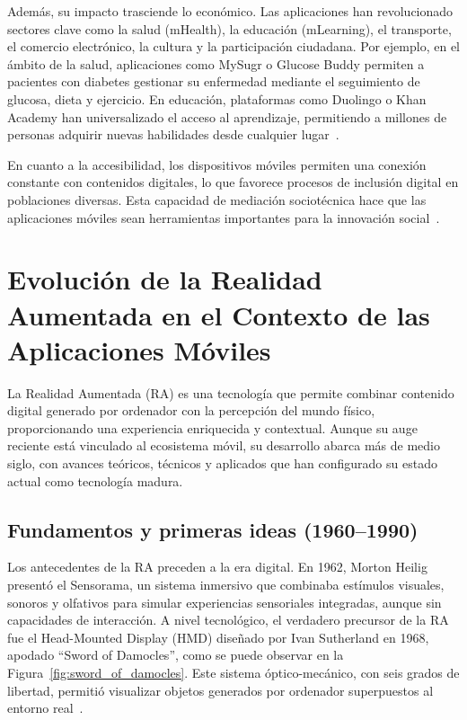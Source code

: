 Además, su impacto trasciende lo económico. Las aplicaciones han revolucionado sectores clave como la salud (mHealth), la educación (mLearning), el transporte, el comercio electrónico, la cultura y la participación ciudadana. Por ejemplo, en el ámbito de la salud, aplicaciones como MySugr o Glucose Buddy permiten a pacientes con diabetes gestionar su enfermedad mediante el seguimiento de glucosa, dieta y ejercicio. En educación, plataformas como Duolingo o Khan Academy han universalizado el acceso al aprendizaje, permitiendo a millones de personas adquirir nuevas habilidades desde cualquier lugar~\cite{parsons2020}.

En cuanto a la accesibilidad, los dispositivos móviles permiten una conexión constante con contenidos digitales, lo que favorece procesos de inclusión digital en poblaciones diversas. Esta capacidad de mediación sociotécnica hace que las aplicaciones móviles sean herramientas importantes para la innovación social~\cite{parsons2020}.



\section{Evolución de la Realidad Aumentada en el Contexto de las Aplicaciones Móviles}

La Realidad Aumentada (RA) es una tecnología que permite combinar contenido digital generado por ordenador con la percepción del mundo físico, proporcionando una experiencia enriquecida y contextual. Aunque su auge reciente está vinculado al ecosistema móvil, su desarrollo abarca más de medio siglo, con avances teóricos, técnicos y aplicados que han configurado su estado actual como tecnología madura.

\subsection{Fundamentos y primeras ideas (1960–1990)}
Los antecedentes de la RA preceden a la era digital. En 1962, Morton Heilig presentó el Sensorama, un sistema inmersivo que combinaba estímulos visuales, sonoros y olfativos para simular experiencias sensoriales integradas, aunque sin capacidades de interacción. A nivel tecnológico, el verdadero precursor de la RA fue el Head-Mounted Display (HMD) diseñado por Ivan Sutherland en 1968, apodado “Sword of Damocles”, como se puede observar en la Figura~\ref{fig:sword_of_damocles}. Este sistema óptico-mecánico, con seis grados de libertad, permitió visualizar objetos generados por ordenador superpuestos al entorno real~\cite{azuma1997}.


